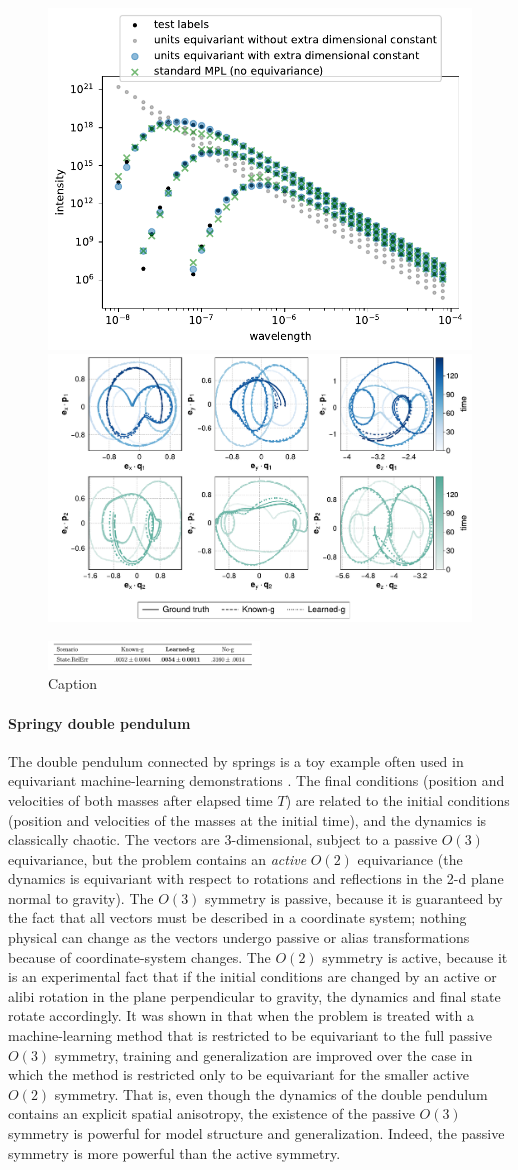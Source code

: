 \documentclass{article}
\theoremstyle{plain}
\theoremstyle{definition}
\theoremstyle{remark}
\begin{document}
\begin{figure}
    \centering
    \includegraphics[height=0.3\textwidth]{units}
    \includegraphics[height=0.3\textwidth]{pendulum}
    
    \includegraphics[width=0.5\textwidth]{table}
    \caption{Caption}
    \label{fig:my_label}
\end{figure}

\paragraph{Springy double pendulum}

The double pendulum connected by springs is a toy example often used in equivariant machine-learning demonstrations \cite{finzi2021practical,yao2021simple}. 
The final conditions (position and velocities of both masses after elapsed time $T$) are related to the initial conditions (position and velocities of the masses at the initial time), and the dynamics is classically chaotic.
The vectors are 3-dimensional, subject to a passive $O(3)$ equivariance, but the problem contains an \emph{active} $O(2)$ equivariance (the dynamics is equivariant with respect to rotations and reflections in the 2-d plane normal to gravity).
The $O(3)$ symmetry is passive, because it is guaranteed by the fact that all vectors must be described in a coordinate system; nothing physical can change as the vectors undergo passive or alias transformations because of coordinate-system changes.
The $O(2)$ symmetry is active, because it is an experimental fact that if the initial conditions are changed by an active or alibi rotation in the plane perpendicular to gravity, the dynamics and final state rotate accordingly.
It was shown in \cite{yao2021simple} that when the problem is treated with a machine-learning method that is restricted to be equivariant to the full passive $O(3)$ symmetry, training and generalization are improved over the case in which the method is restricted only to be equivariant for the smaller active $O(2)$ symmetry.
That is, even though the dynamics of the double pendulum contains an explicit spatial anisotropy, the existence of the passive $O(3)$ symmetry is powerful for model structure and generalization.
Indeed, the passive symmetry is more powerful than the active symmetry.
\end{document}
